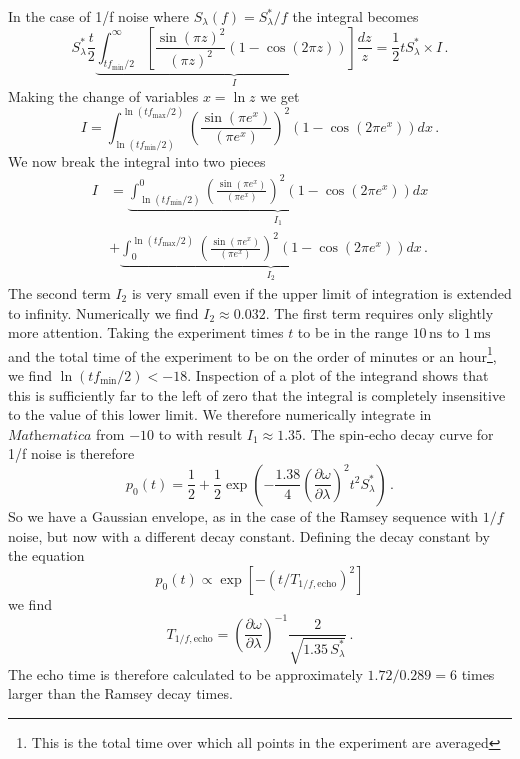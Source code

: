 
In the case of 1/f noise where $S_\lambda(f)=S^*_\lambda / f$ the integral becomes
\begin{equation}
  S^*_\lambda \frac{t}{2} \underbrace{\int_{t f_{\textrm{min}}/2}^{\infty} \left[ \frac{\sin\left(\pi z\right)^2}{\left(\pi z\right)^2} \left(1 - \cos\left(2\pi z\right)\right) \right] \frac{dz}{z}}_I
  = \frac{1}{2} t S^*_\lambda \times I \, .
\end{equation}
Making the change of variables $x=\ln z$ we get
\begin{equation}
  I = \int_{\ln\left(tf_{\textrm{min}}/2\right)}^{\ln\left(tf_{\textrm{max}}/2\right)}\left(\frac{\sin\left(\pi e^{x}\right)}{\left(\pi e^{x}\right)}\right)^{2}\left(1-\cos\left(2\pi e^{x}\right)\right)dx \, .
\end{equation}
We now break the integral into two pieces
\begin{align}
I &=
\underbrace{\int_{\ln\left(tf_{\textrm{min}}/2\right)}^{0}\left(\frac{\sin\left(\pi e^{x}\right)}{\left(\pi e^{x}\right)}\right)^{2}\left(1-\cos\left(2\pi e^{x}\right)\right)dx}_{I_{1}} \nonumber \\
&+ \underbrace{\int_{0}^{\ln\left(tf_{\textrm{max}}/2\right)}\left(\frac{\sin\left(\pi e^{x}\right)}{\left(\pi e^{x}\right)}\right)^{2}\left(1-\cos\left(2\pi e^{x}\right)\right)dx}_{I_{2}} \, .
\end{align}
The second term $I_{2}$ is very small even if the upper limit of integration is extended to infinity.
Numerically we find $I_{2}\approx0.032$.
The first term requires only slightly more attention.
Taking the experiment times $t$ to be in the range $10\,\text{ns}$ to $1\,\text{ms}$ and the total time of the experiment to be on the order of minutes or an hour\footnote{This is the total time over which all points in the experiment are averaged}, we find $\ln(t f_{\text{min}} / 2) < -18$.
Inspection of a plot of the integrand shows that this is sufficiently far to the left of zero that the integral is completely insensitive to the value of this lower limit.
We therefore numerically integrate in $\textit{Mathematica}$ from $-10$ to with result $I_1 \approx 1.35$.
The spin-echo decay curve for 1/f noise is therefore
\begin{equation}
  p_0(t) = \frac{1}{2} + \frac{1}{2} \exp \left(-\frac{1.38}{4} \left( \frac{\partial\omega}{\partial\lambda} \right)^2 t^2 S^*_\lambda \right) \, .
\end{equation}
So we have a Gaussian envelope, as in the case of the Ramsey sequence with $1/f$ noise, but now with a different decay constant.
Defining the decay constant by the equation
\begin{equation}
  p_0(t) \propto \exp \left[ - \left( t / T_{1/f,\text{echo}} \right)^2 \right]
\end{equation}
we find
\begin{equation}
  T_{1/f,\textrm{echo}}
  = \left( \frac{\partial\omega}{\partial\lambda} \right)^{-1} \frac{2}{\sqrt{1.35 \, S^*_\lambda}}
  \, .
\end{equation}
The echo time is therefore calculated to be approximately $1.72/0.289=6$ times larger than the Ramsey decay times.

